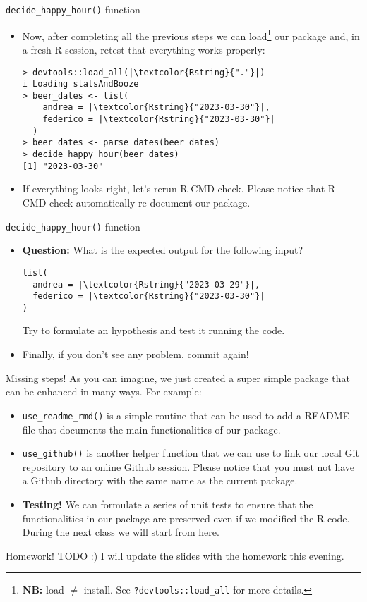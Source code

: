 \documentclass[
hyperref={bookmarks=false},
xcolor={dvipsnames,svgnames*,x11names*}, 
12pt
]{beamer}
\begin{document}
\begin{frame}[fragile]{\texttt{decide\_happy\_hour()} function}
\vspace{-0.5cm}
\begin{itemize}
\itemsep 2ex
\item Now, after completing all the previous steps we can load\footnote{\textbf{NB:} load $\ne$ install. See \texttt{?devtools::load\_all} for more details.} our package and, in a fresh R session, retest that everything works properly: 
\begin{lstlisting}
> devtools::load_all(|\textcolor{Rstring}{"."}|)
i Loading statsAndBooze
> beer_dates <- list(
    andrea = |\textcolor{Rstring}{"2023-03-30"}|, 
    federico = |\textcolor{Rstring}{"2023-03-30"}|
  )
> beer_dates <- parse_dates(beer_dates)
> decide_happy_hour(beer_dates)
[1] "2023-03-30"
\end{lstlisting}
\item If everything looks right, let's rerun R CMD check. Please notice that R CMD check automatically re-document our package. 
\end{itemize}
\end{frame}

\begin{frame}[fragile]{\texttt{decide\_happy\_hour()} function}
\vspace{-0.5cm}
\begin{itemize}
\itemsep 2ex
\item \textbf{Question:} What is the expected output for the following input? 
\begin{lstlisting}
list(
  andrea = |\textcolor{Rstring}{"2023-03-29"}|, 
  federico = |\textcolor{Rstring}{"2023-03-30"}|
)
\end{lstlisting}
Try to formulate an hypothesis and test it running the code. 
\item Finally, if you don't see any problem, commit again! 
\end{itemize}
\end{frame}

\begin{frame}[fragile]{Missing steps!}
\vspace{-0.5cm}
As you can imagine, we just created a super simple package that can be enhanced in many ways. For example: 
\begin{itemize}
\itemsep 2ex
\item \texttt{use\_readme\_rmd()} is a simple routine that can be used to add a README file that documents the main functionalities of our package. 
\item \texttt{use\_github()} is another helper function that we can use to link our local Git repository to an online Github session. Please notice that you must not have a Github directory with the same name as the current package. 
\item \textbf{Testing!} We can formulate a series of unit tests to ensure that the functionalities in our package are preserved even if we modified the R code. During the next class we will start from here. 
\end{itemize}
\end{frame}

\begin{frame}[fragile]{Homework!}
TODO :) I will update the slides with the homework this evening. 
\end{frame}
\end{document}
